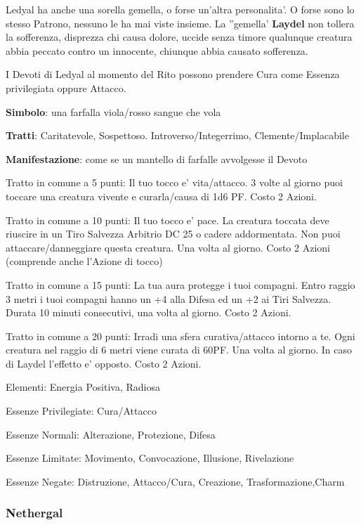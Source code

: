 \documentclass[a4paper,11pt,twoside,openany]{book}
\begin{document}
{Ledyal ha anche una sorella gemella, o forse un'altra personalita'. O forse sono lo stesso Patrono, nessuno le ha mai viste insieme. La ''gemella' \textbf{Laydel} non tollera la sofferenza, disprezza chi causa dolore, uccide senza timore qualunque creatura abbia peccato contro un innocente, chiunque abbia causato sofferenza.

I Devoti di Ledyal al momento del Rito possono prendere Cura come Essenza privilegiata oppure Attacco.

\textbf{Simbolo}: una farfalla viola/rosso sangue che vola

\textbf{Tratti}: Caritatevole, Sospettoso. Introverso/Integerrimo, Clemente/Implacabile

\textbf{Manifestazione}: come se un mantello di farfalle avvolgesse il Devoto

\bigskip

Tratto in comune a 5 punti: Il tuo tocco e' vita/attacco. 3 volte al giorno puoi toccare una creatura vivente e curarla/causa di 1d6 PF. Costo 2 Azioni.

Tratto in comune a 10 punti: Il tuo tocco e' pace. La creatura toccata deve riuscire in un Tiro Salvezza Arbitrio DC 25 o cadere addormentata. Non puoi attaccare/danneggiare questa creatura. Una volta al giorno. Costo 2 Azioni (comprende anche l'Azione di tocco)

Tratto in comune a 15 punti: La tua aura protegge i tuoi compagni. Entro raggio 3 metri i tuoi compagni hanno un +4 alla Difesa ed un +2 ai Tiri Salvezza. Durata 10 minuti consecutivi, una volta al giorno. Costo 2 Azioni.

Tratto in comune a 20 punti: Irradi una sfera curativa/attacco intorno a te. Ogni creatura nel raggio di 6 metri viene curata di 60PF. Una volta al giorno. In caso di Laydel l'effetto e' opposto. Costo 2 Azioni.

\bigskip

Elementi: Energia Positiva, Radiosa

\bigskip

Essenze Privilegiate: Cura/Attacco

Essenze Normali: Alterazione, Protezione, Difesa

Essenze Limitate: Movimento, Convocazione, Illusione, Rivelazione

Essenze Negate: Distruzione, Attacco/Cura, Creazione, Trasformazione,Charm

\subsubsection{Nethergal}

}
\end{document}
